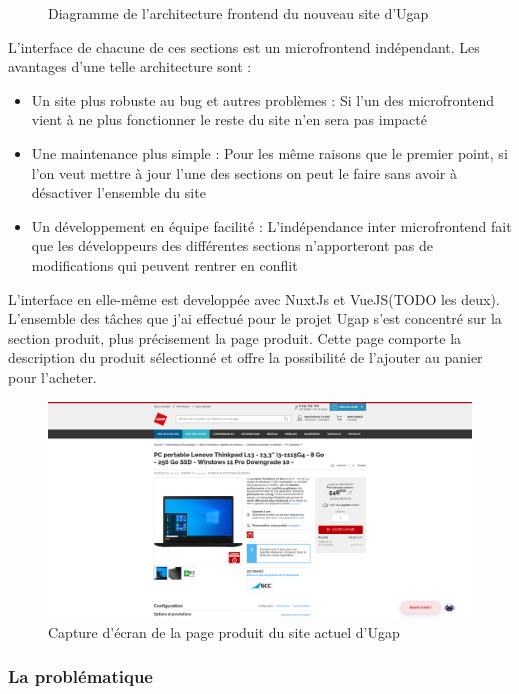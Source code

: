 \documentclass[12pt]{article}
\begin{document}
\begin {sloppypar}
\begin{figure}[h]
  \caption {Diagramme de l'architecture frontend du nouveau site d'Ugap}
\end{figure}
L'interface de chacune de ces sections est un microfrontend indépendant. Les avantages d'une telle 
architecture sont : 
\begin{itemize}
  \item 
    Un site plus robuste au bug et autres problèmes : Si l'un des microfrontend vient à ne plus 
    fonctionner le reste du site n'en sera pas impacté
  \item 
    Une maintenance plus simple : Pour les même raisons que le premier point, si l'on veut 
    mettre à jour l'une des sections on peut le faire sans avoir à désactiver l'ensemble du site 
  \item 
    Un développement en équipe facilité : L'indépendance inter microfrontend fait que les développeurs 
    des différentes sections n'apporteront pas de modifications qui peuvent rentrer en conflit
\end{itemize}
L'interface en elle-même est developpée avec NuxtJs et VueJS(TODO les deux). L'ensemble des tâches 
que j'ai effectué pour le projet Ugap s'est concentré sur la section produit, plus précisement 
la page produit. Cette page comporte la description du produit sélectionné et offre la possibilité 
de l'ajouter au panier pour l'acheter.
\begin{figure}[h]
  \includegraphics[width=\textwidth] {sc_product-page.png}
  \caption {Capture d'écran de la page produit du site actuel d'Ugap}
\end{figure}
\newpage 
\subsubsection{La problématique}

\end{sloppypar}
\end{document}
